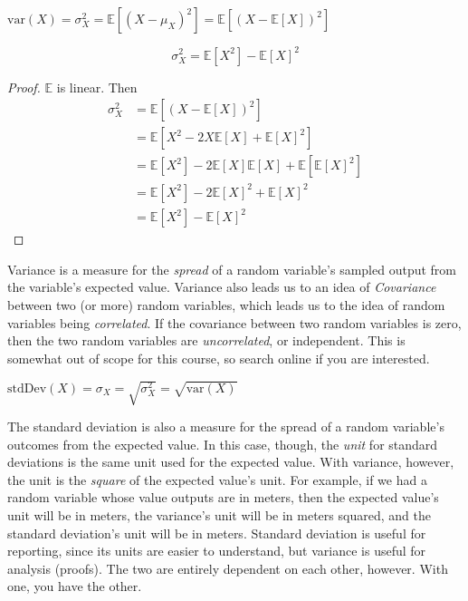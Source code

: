 \documentclass[main.tex]{subfiles}
\begin{document}
\begin{defn}
	\(\text{var}(X) = \sigma_X^2 = \mathbb{E}[(X-\mu_X)^2] = \mathbb{E}[(X-\mathbb{E}[X])^2]\)
\end{defn}

\begin{prop}
	\[\sigma_X^2 = \mathbb{E}[X^2] - \mathbb{E}[X]^2\]
\end{prop}

\begin{proof}
	\(\mathbb{E}\) is linear. Then
	\begin{align*}
	\sigma_X^2 &= \mathbb{E}[(X-\mathbb{E}[X])^2] \\
	&= \mathbb{E}[X^2 - 2X\mathbb{E}[X] + \mathbb{E}[X]^2] \\
	&= \mathbb{E}[X^2] - 2\mathbb{E}[X]\mathbb{E}[X] + \mathbb{E}[\mathbb{E}[X]^2] \\
	&= \mathbb{E}[X^2] - 2\mathbb{E}[X]^2 + \mathbb{E}[X]^2 \\
	&= \mathbb{E}[X^2] - \mathbb{E}[X]^2
	\end{align*}
\end{proof}

Variance is a measure for the \textit{spread} of a random variable's sampled output from the variable's expected value.
Variance also leads us to an idea of \textit{Covariance} between two (or more) random variables, which leads us to the idea of random variables being \textit{correlated}. If the covariance between two random variables is zero, then the two random variables are \textit{uncorrelated}, or independent. This is somewhat out of scope for this course, so search online if you are interested.

\begin{defn}
	\(\text{stdDev}(X) = \sigma_X = \sqrt{\sigma_X^2} = \sqrt{\text{var}(X)}\)
\end{defn}

The standard deviation is also a measure for the spread of a random variable's outcomes from the expected value. In this case, though, the \textit{unit} for standard deviations is the same unit used for the expected value. With variance, however, the unit is the \textit{square} of the expected value's unit. For example, if we had a random variable whose value outputs are in meters, then the expected value's unit will be in meters, the variance's unit will be in meters squared, and the standard deviation's unit will be in meters. Standard deviation is useful for reporting, since its units are easier to understand, but variance is useful for analysis (proofs). The two are entirely dependent on each other, however. With one, you have the other.
\end{document}
